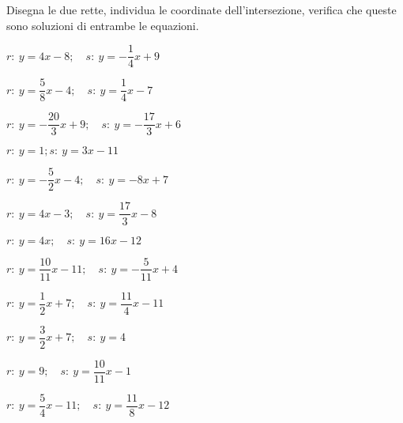\begin{esercizio}\label{ese:}
 Disegna le due rette, individua le 
coordinate dell'intersezione, verifica che queste sono soluzioni di 
entrambe le equazioni.
 \begin{multicols}{2}
 \begin{enumeratea}
  \item  $r:~y = 4 x -8; \quad s:~y = -\dfrac{1}{4} x +9$
  \item  $r:~y = \dfrac{5}{8} x -4; \quad s:~y = \dfrac{1}{4} x -7$
  \item  $r:~y = -\dfrac{20}{3} x +9; \quad s:~y = -\dfrac{17}{3} x +6$
  \item  $r:~y = 1; s:~y = 3 x -11$
  \item  $r:~y = -\dfrac{5}{2} x -4; \quad s:~y = -8 x +7$
  \item  $r:~y = 4 x -3; \quad s:~y = \dfrac{17}{3} x -8$
  \item  $r:~y = 4 x ; \quad s:~y = 16 x -12$
  \item  $r:~y = \dfrac{10}{11} x -11; \quad s:~y = -\dfrac{5}{11} x +4$
  \item  $r:~y = \dfrac{1}{2} x +7; \quad s:~y = \dfrac{11}{4} x -11$
  \item  $r:~y = \dfrac{3}{2} x +7; \quad s:~y = 4$
  \item  $r:~y = 9; \quad s:~y = \dfrac{10}{11} x -1$
  \item  $r:~y = \dfrac{5}{4} x -11; \quad s:~y = \dfrac{11}{8} x -12$
 \end{enumeratea}
 \end{multicols}
\end{esercizio}

